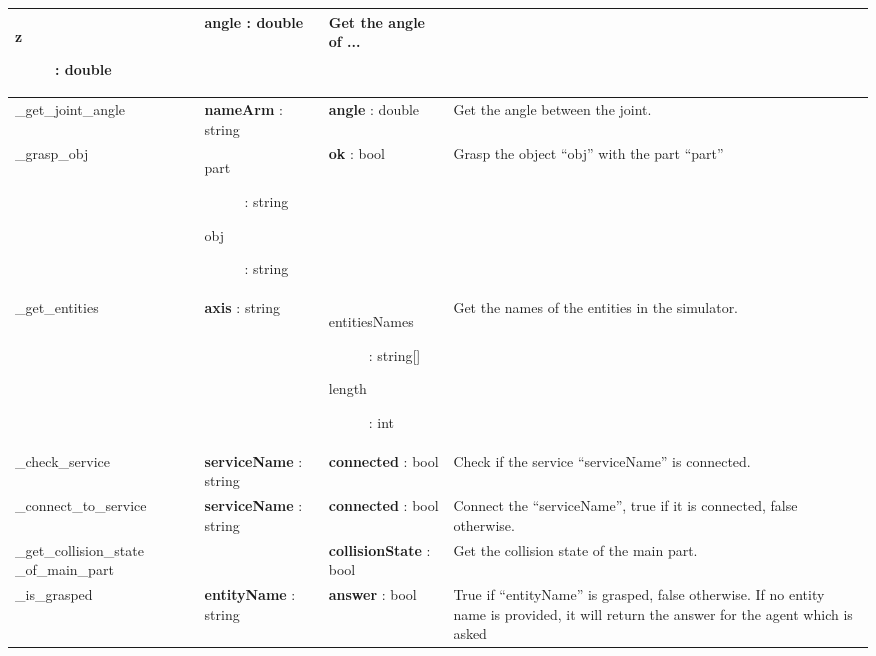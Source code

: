 \begin{supertabular}{|p{2.9cm}|p{2.5cm}|p{3cm}|p{5.5cm}|}
\begin{minipage}{3cm}
\begin{description}
  				\item[z] : double
  			\end{description}
  			\medskip
  		\end{minipage} & \textbf{angle} : double & Get the angle of ...\\
  	\hline
  	\_get\_joint\_angle & \textbf{nameArm} : string & \textbf{angle} : double & Get the angle between the joint.\\
  	\hline
  	\_grasp\_obj & 
  		\begin{minipage}{3cm}
  			\medskip
  			\begin{description} 
  				\item[part] : string
  				\item[obj] : string
  			\end{description}
  			\medskip
  		\end{minipage} & \textbf{ok} : bool & Grasp the object ``obj'' with the part ``part''\\
  	\hline
  	\_get\_entities & \textbf{axis} : string & 
  		\begin{minipage}{3cm}
  			\medskip
  			\begin{description} 
  				\item[entitiesNames] : string[] 
  				\item[length] : int
  			\end{description}
  			\medskip
  		\end{minipage} & Get the names of the entities in the simulator.\\
  	\hline
  	\_check\_service & \textbf{serviceName} : string & \textbf{connected} : bool & Check if the service ``serviceName'' is connected.\\
  	\hline
  	\_connect\_to\_service & \textbf{serviceName} : string & \textbf{connected} : bool & Connect the ``serviceName'', true if it is connected, false otherwise.\\
  	\hline
  	\_get\_collision\_state \_of\_main\_part & & \textbf{collisionState} : bool & Get the collision state of the main part.\\
  	\hline
  	\_is\_grasped & \textbf{entityName} : string & \textbf{answer} : bool & True if ``entityName'' is grasped, false otherwise. If no entity name is provided, it will return the answer for the agent which is asked\\
  	\hline
\end{supertabular}